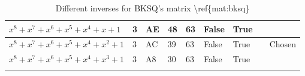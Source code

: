 \begin{footnotesize}
\begin{longtable}{|l|l|l|l|l|l|l|l|l|}
$x^8 + x^7 + x^6 + x^5 + x^4 + x + 1$   & 3             & AE                & 48                  & 63                    & False               & True              &              &                \\ \hline
$x^8 + x^7 + x^6 + x^5 + x^4 + x^2 + 1$ & 3             & AC                & 39                  & 63                    & False               & True              &              & Chosen         \\ \hline
$x^8 + x^7 + x^6 + x^5 + x^4 + x^3 + 1$ & 3             & A8                & 30                  & 63                    & False               & True              &              &                \\ \hline
\caption{Different inverses for BKSQ's matrix \textbackslash{}ref\{mat:bksq\}}
\label{tab:poly-bksq}\\
\end{longtable}
\end{footnotesize}


